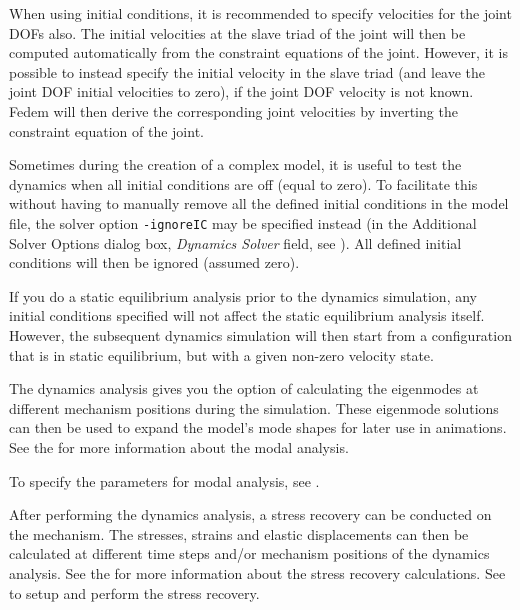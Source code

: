 
When using initial conditions, it is recommended to specify velocities
for the joint DOFs also. The initial velocities at the slave triad of
the joint will then be computed automatically from the constraint
equations of the joint. However, it is possible to instead specify the
initial velocity in the slave triad (and leave the joint DOF initial
velocities to zero), if the joint DOF velocity is not known.
Fedem will then derive the corresponding
joint velocities by inverting the constraint equation of the joint.

Sometimes during the creation of a complex model, it is useful to test
the dynamics when all initial conditions are off (equal to zero).
To facilitate this without having to manually remove all the defined
initial conditions in the model file, the solver option {\tt-ignoreIC}
may be specified instead (in the Additional Solver Options dialog box,
{\sl Dynamics Solver} field,
see ).
All defined initial conditions will then be ignored (assumed zero).

If you do a static equilibrium analysis prior to the dynamics simulation, any
initial conditions specified will not affect the static equilibrium analysis
itself. However, the subsequent dynamics simulation will then start from
a configuration that is in static equilibrium,
but with a given non-zero velocity state.


The dynamics analysis gives you the option of calculating the eigenmodes
at different mechanism positions during the simulation.
These eigenmode solutions can then be used to expand the model's mode shapes
for later use in animations.
See the 
for more information about the modal analysis.

To specify the parameters for modal analysis, see
.



After performing the dynamics analysis,
a stress recovery can be conducted on the mechanism.
The stresses, strains and elastic displacements can then be calculated at
different time steps and/or mechanism positions of the dynamics analysis.
See the 
for more information about the stress recovery calculations.
See 
to setup and perform the stress recovery.

